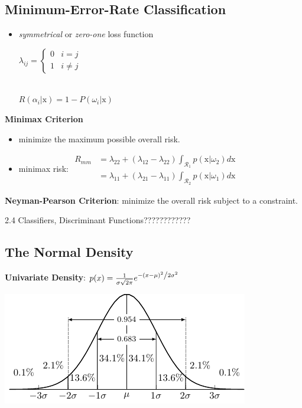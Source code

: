 \documentclass{../cheat}
\begin{document}
\begin{multicols}{3}
	\subsection{Minimum-Error-Rate Classification}
	\begin{itemize}[nolistsep, leftmargin=1em]
		\item \textit{symmetrical} or \textit{zero-one} loss function\\ 
			\centerline{ $\lambda_{ij}= \left\{ \begin{array}{rc}
				0 & i=j\\
				1 & i \neq j
			\end{array}\right.$}\\
			$R(\alpha_i|\mathrm{x}) = 1-P(\omega_i|\mathrm{x}) $
	\end{itemize}
	
	\textbf{Minimax Criterion}
	\begin{itemize}[nolistsep, leftmargin=1em]
		\item minimize the maximum possible overall risk.
		\item minimax risk: $\begin{array}{ll}
		 R_{mm} &= \lambda_{22}+(\lambda_{12}-\lambda_{22})\int_{\mathcal{R}_1} p(\mathrm{x}|\omega_2) d \mathrm{x}\\
		 &= \lambda_{11}+(\lambda_{21}-\lambda_{11})\int_{\mathcal{R}_2} p(\mathrm{x}|\omega_1) d \mathrm{x}
		\end{array}$
	\end{itemize}
	
	\textbf{Neyman-Pearson Criterion}: minimize the overall risk subject to a constraint.
	
	
	2.4 Classifiers, Discriminant Functions????????????
	
	
	\subsection{The Normal Density}
	\textbf{Univariate Density}:
	$p(x) = \frac{1}{{\sigma \sqrt {2\pi } }}e^{{{ - \left( {x - \mu } \right)^2 } \mathord{\left/
	 {\vphantom {{ - \left( {x - \mu } \right)^2 } {2\sigma ^2 }}} \right.
	 \kern-\nulldelimiterspace} {2\sigma ^2 }}}$\\
	\centerline{\includegraphics[scale=.8]{plots/gaussian_2d}}


\end{multicols}
\end{document}
